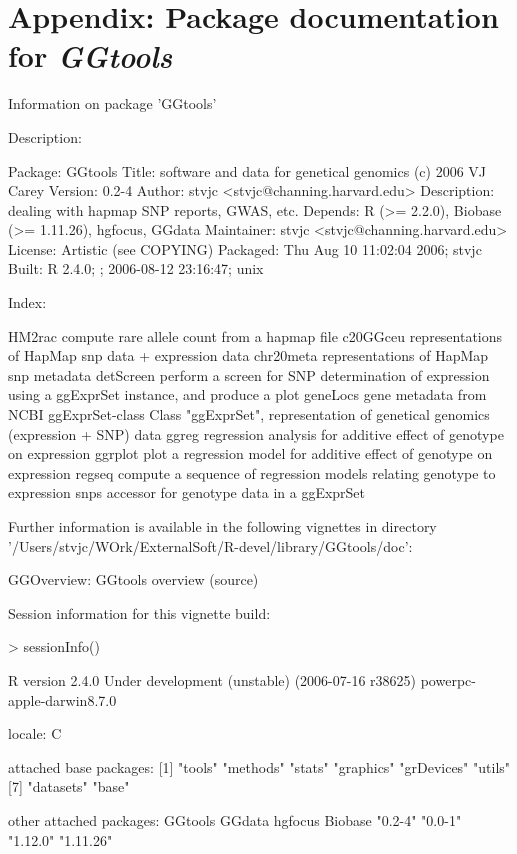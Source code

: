 \documentclass[12pt]{article}
\newcommand{\Rpackage}[1]{{\textit{#1}}}
\begin{document}
\section{Appendix: Package documentation for \Rpackage{GGtools}}
\begin{Schunk}
\begin{Soutput}
		Information on package 'GGtools'

Description:


Package:       GGtools
Title:         software and data for genetical genomics (c) 2006 VJ
               Carey
Version:       0.2-4
Author:        stvjc <stvjc@channing.harvard.edu>
Description:   dealing with hapmap SNP reports, GWAS, etc.
Depends:       R (>= 2.2.0), Biobase (>= 1.11.26), hgfocus, GGdata
Maintainer:    stvjc <stvjc@channing.harvard.edu>
License:       Artistic (see COPYING)
Packaged:      Thu Aug 10 11:02:04 2006; stvjc
Built:         R 2.4.0; ; 2006-08-12 23:16:47; unix


Index:


HM2rac                  compute rare allele count from a hapmap file
c20GGceu                representations of HapMap snp data + expression
                        data
chr20meta               representations of HapMap snp metadata
detScreen               perform a screen for SNP determination of
                        expression using a ggExprSet instance, and
                        produce a plot
geneLocs                gene metadata from NCBI
ggExprSet-class         Class "ggExprSet", representation of genetical
                        genomics (expression + SNP) data
ggreg                   regression analysis for additive effect of
                        genotype on expression
ggrplot                 plot a regression model for additive effect of
                        genotype on expression
regseq                  compute a sequence of regression models
                        relating genotype to expression
snps                    accessor for genotype data in a ggExprSet


Further information is available in the following vignettes in
directory '/Users/stvjc/WOrk/ExternalSoft/R-devel/library/GGtools/doc':


GGOverview: GGtools overview (source)
\end{Soutput}
\end{Schunk}

Session information for this vignette build:
\begin{Schunk}
\begin{Sinput}
> sessionInfo()
\end{Sinput}
\begin{Soutput}
R version 2.4.0 Under development (unstable) (2006-07-16 r38625) 
powerpc-apple-darwin8.7.0 

locale:
C

attached base packages:
[1] "tools"     "methods"   "stats"     "graphics"  "grDevices" "utils"    
[7] "datasets"  "base"     

other attached packages:
  GGtools    GGdata   hgfocus   Biobase 
  "0.2-4"   "0.0-1"  "1.12.0" "1.11.26" 
\end{Soutput}
\end{Schunk}
\end{document}
